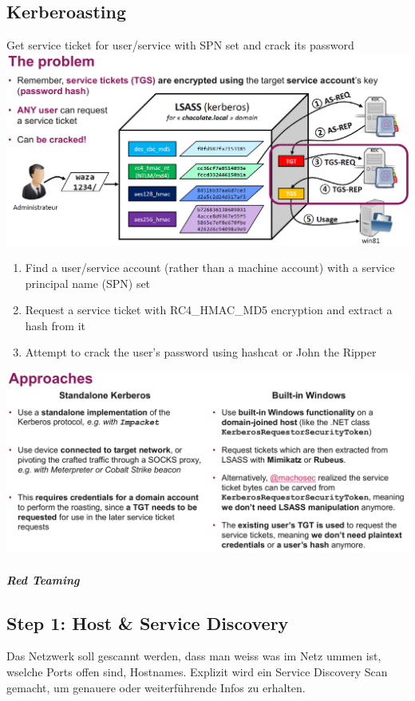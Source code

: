 \subsection{Kerberoasting}
Get service ticket for user/service with SPN set and crack its password
\includegraphics[width=\linewidth]{./img/14-red_teaming/kerberoasting}
\begin{enumerate}
    \item Find a user/service account (rather than a machine account) with a service principal name (SPN) set
    \item Request a service ticket with RC4\_HMAC\_MD5 encryption and extract a hash from it
    \item Attempt to crack the user's password using hashcat or John the Ripper
\end{enumerate}
\includegraphics[width=\linewidth]{./img/14-red_teaming/kerberos_tgt}

\subparagraph{Red Teaming}
\subsection{Step 1: Host \& Service Discovery}
Das Netzwerk soll gescannt werden, dass man weiss was im Netz ummen ist, wselche Ports offen sind, Hostnames.
Explizit wird ein Service Discovery Scan gemacht, um genauere oder weiterführende Infos zu erhalten. 


